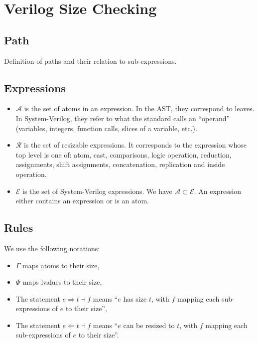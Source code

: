 \documentclass{article}
\renewcommand{\S}{\ensuremath{\Rightarrow}}
\newcommand{\C}{\ensuremath{\Leftarrow}}
\newcommand{\s}[3]{#1 \S{} #2 \dashv{} #3}
\renewcommand{\c}[3]{#1 \C{} #2 \dashv{} #3}
\begin{document}
\section*{Verilog Size Checking}

\subsection*{Path}
Definition of paths and their relation to sub-expressions.

\subsection*{Expressions}

\begin{itemize}
    \item $\mathcal{A}$ is the set of atoms in an expression. In the AST, they correspond to leaves. In System-Verilog, they refer to what the standard calls an ``operand'' (variables, integers, function calls, slices of a variable, etc.).
    \item $\mathcal{R}$ is the set of resizable expressions. It corresponds to the expression whose top level is one of: atom, cast, comparisons, logic operation, reduction, assignments, shift assignments, concatenation, replication and inside operation.
    \item $\mathcal{E}$ is the set of System-Verilog expressions. We have $\mathcal{A} \subset \mathcal{E}$. An expression either contains an expression or is an atom.
\end{itemize}

\subsection*{Rules}
We use the following notations:
\begin{itemize}
    \item $\Gamma$ maps atoms to their size,
    \item $\Phi$ maps lvalues to their size,
    \item The statement $\s{e}{t}{f}$ means ``$e$ has size $t$, with $f$ mapping each sub-expressions of $e$ to their size'',
    \item The statement $\c{e}{t}{f}$ means ``$e$ can be resized to $t$, with $f$ mapping each sub-expressions of $e$ to their size''.
\end{itemize}
\end{document}
